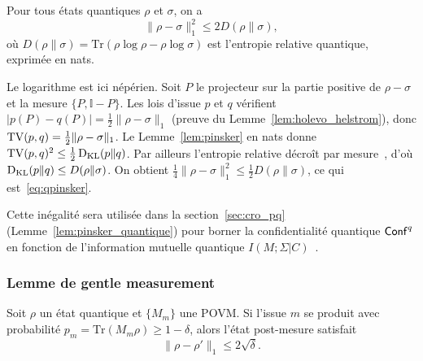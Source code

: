 \begin{sloppypar}
\begin{lemma}\label{lem:pinsker_quantique_etat_art}
Pour tous \'etats quantiques $\rho$ et $\sigma$, on a
\begin{equation}
\|\rho - \sigma\|_1^2 \leq 2 D(\rho\|\sigma),
\label{eq:qpinsker}
\end{equation}
o\`u $D(\rho\|\sigma) = \mathrm{Tr}(\rho\log\rho - \rho\log\sigma)$ est l'entropie
relative quantique, exprim\'ee en nats.
\end{lemma}

\begin{Preuve}
Le logarithme est ici n\'ep\'erien. Soit $P$ le projecteur sur la partie positive
de $\rho - \sigma$ et la mesure $\{P, \mathbb{I}-P\}$. Les lois d'issue $p$ et $q$
v\'erifient $|p(P) - q(P)| = \tfrac12\|\rho-\sigma\|_1$ (preuve du
Lemme~\ref{lem:holevo_helstrom}), donc $\operatorname{TV}(p,q) = \tfrac12\|\rho-\sigma\|_1$.
Le Lemme~\ref{lem:pinsker} en nats donne $\operatorname{TV}(p,q)^2 \leq \tfrac12\operatorname{D_{\text{KL}}}(p\|q)$. Par ailleurs
l'entropie relative d\'ecro\^it par mesure~\cite{Lindblad}, d'o\`u
$\operatorname{D_{\text{KL}}}(p\|q) \leq D(\rho\|\sigma)$. On obtient
$\tfrac14\|\rho-\sigma\|_1^2 \leq \tfrac12 D(\rho\|\sigma)$, ce qui est~\eqref{eq:qpinsker}.
\end{Preuve}

Cette in\'egalit\'e sera utilis\'ee dans la section~\ref{sec:cro_pq} (Lemme~\ref{lem:pinsker_quantique}) pour borner la
confidentialit\'e quantique $\mathsf{Conf}^q$ en fonction de l'information mutuelle
quantique $I(M;\Sigma|C)$~\cite{Ohya1993}.

\subsubsection{Lemme de gentle measurement}
\label{subsubsec:gentle_measurement}

\begin{lemma}\label{lem:mesure_douce_etat_art}
Soit $\rho$ un \'etat quantique et $\{M_m\}$ une POVM. Si l'issue $m$ se produit
avec probabilit\'e $p_m = \mathrm{Tr}(M_m\rho) \geq 1 - \delta$, alors l'\'etat
post-mesure satisfait
\begin{equation}
\|\rho - \rho'\|_1 \leq 2\sqrt{\delta}.
\label{eq:gentle}
\end{equation}
\end{lemma}


\end{sloppypar}
